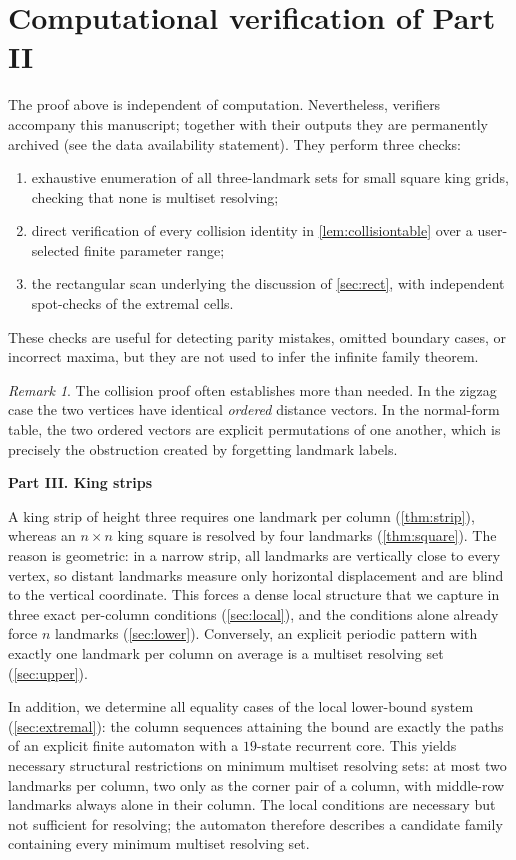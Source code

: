 \documentclass[11pt]{amsart}
\theoremstyle{remark}
\newtheorem{remark}[remark]{Remark}
\newcommand{\partheading}[1]{\bigskip\begin{center}{\Large\bfseries #1}\end{center}\medskip}
\begin{document}
\section{Computational verification of Part II}\label{sec:verifsquare}

The proof above is independent of computation.  Nevertheless, verifiers accompany this manuscript; together with their outputs they are permanently archived (see the data availability statement).  They perform three checks:
\begin{enumerate}[label=(\roman*)]
\item exhaustive enumeration of all three-landmark sets for small square king grids, checking that none is multiset resolving;
\item direct verification of every collision identity in \cref{lem:collisiontable} over a user-selected finite parameter range;
\item the rectangular scan underlying the discussion of \cref{sec:rect}, with independent spot-checks of the extremal cells.
\end{enumerate}
These checks are useful for detecting parity mistakes, omitted boundary cases, or incorrect maxima, but they are not used to infer the infinite family theorem.

\begin{remark}
The collision proof often establishes more than needed.  In the zigzag case the two vertices have identical \emph{ordered} distance vectors.  In the normal-form table, the two ordered vectors are explicit permutations of one another, which is precisely the obstruction created by forgetting landmark labels.
\end{remark}

\partheading{Part III. King strips}

A king strip of height three requires one landmark per column (\cref{thm:strip}), whereas an $n\times n$ king square is resolved by four landmarks (\cref{thm:square}).  The reason is geometric: in a narrow strip, all landmarks are vertically close to every vertex, so distant landmarks measure only horizontal displacement and are blind to the vertical coordinate.  This forces a dense local structure that we capture in three exact per-column conditions (\cref{sec:local}), and the conditions alone already force $n$ landmarks (\cref{sec:lower}).  Conversely, an explicit periodic pattern with exactly one landmark per column on average is a multiset resolving set (\cref{sec:upper}).

In addition, we determine all equality cases of the local lower-bound system (\cref{sec:extremal}): the column sequences attaining the bound are exactly the paths of an explicit finite automaton with a $19$-state recurrent core.  This yields necessary structural restrictions on minimum multiset resolving sets: at most two landmarks per column, two only as the corner pair of a column, with middle-row landmarks always alone in their column.  The local conditions are necessary but not sufficient for resolving; the automaton therefore describes a candidate family containing every minimum multiset resolving set.
\end{document}
